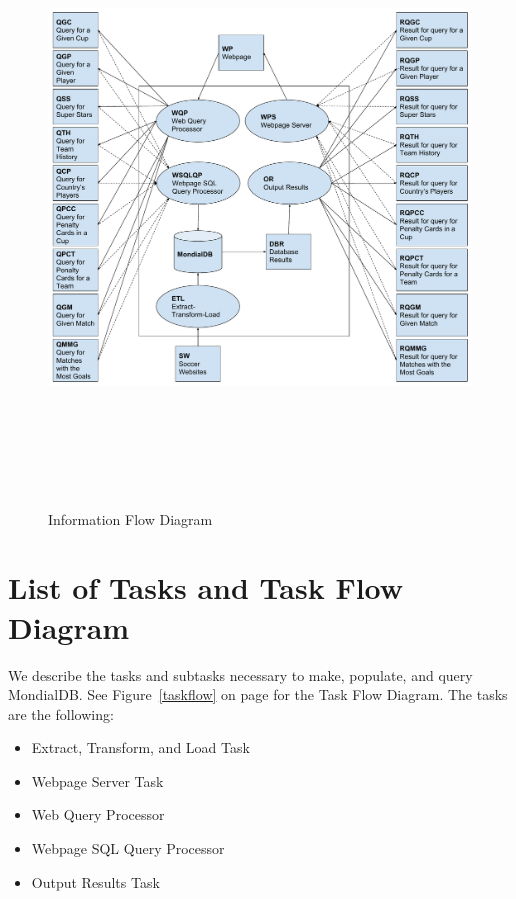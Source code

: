 \documentclass{article}
\begin{document}
\begin{figure}[ph]
\includegraphics[height=462pt, angle=90]{dbflowdiagram}
\caption{Information Flow Diagram}
\label{flow}
\end{figure}

\clearpage

\section{List of Tasks and Task Flow Diagram}
We describe the tasks and subtasks necessary to make, populate, and query MondialDB. 
See Figure~\ref{taskflow} on page \pageref{taskflow} for the Task Flow Diagram. 
The tasks are the following:
\begin{itemize}
  \item Extract, Transform, and Load Task
  \item Webpage Server Task
  \item Web Query Processor
  \item Webpage SQL Query Processor
  \item Output Results Task
\end{itemize}
\end{document}
